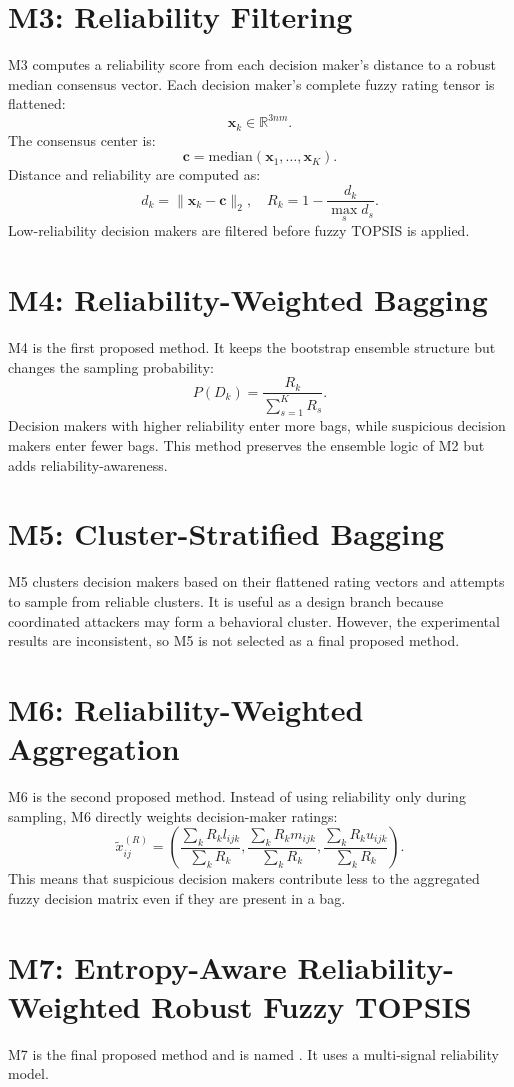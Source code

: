 \section{M3: Reliability Filtering}
M3 computes a reliability score from each decision maker's distance to a robust median consensus vector. Each decision maker's complete fuzzy rating tensor is flattened:
\[
\mathbf{x}_k \in \mathbb{R}^{3nm}.
\]
The consensus center is:
\[
\mathbf{c} = \text{median}(\mathbf{x}_1,\ldots,\mathbf{x}_K).
\]
Distance and reliability are computed as:
\[
d_k=\|\mathbf{x}_k-\mathbf{c}\|_2,
\quad
R_k = 1-\frac{d_k}{\max_s d_s}.
\]
Low-reliability decision makers are filtered before fuzzy TOPSIS is applied.

\section{M4: Reliability-Weighted Bagging}
M4 is the first proposed method. It keeps the bootstrap ensemble structure but changes the sampling probability:
\[
P(D_k)=\frac{R_k}{\sum_{s=1}^{K}R_s}.
\]
Decision makers with higher reliability enter more bags, while suspicious decision makers enter fewer bags. This method preserves the ensemble logic of M2 but adds reliability-awareness.

\section{M5: Cluster-Stratified Bagging}
M5 clusters decision makers based on their flattened rating vectors and attempts to sample from reliable clusters. It is useful as a design branch because coordinated attackers may form a behavioral cluster. However, the experimental results are inconsistent, so M5 is not selected as a final proposed method.

\section{M6: Reliability-Weighted Aggregation}
M6 is the second proposed method. Instead of using reliability only during sampling, M6 directly weights decision-maker ratings:
\[
\tilde{x}_{ij}^{(R)} =
\left(
\frac{\sum_k R_k l_{ijk}}{\sum_k R_k},
\frac{\sum_k R_k m_{ijk}}{\sum_k R_k},
\frac{\sum_k R_k u_{ijk}}{\sum_k R_k}
\right).
\]
This means that suspicious decision makers contribute less to the aggregated fuzzy decision matrix even if they are present in a bag.

\section{M7: Entropy-Aware Reliability-Weighted Robust Fuzzy TOPSIS}
M7 is the final proposed method and is named \methodname. It uses a multi-signal reliability model.

